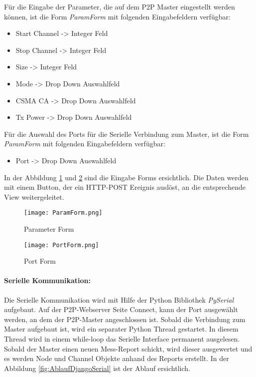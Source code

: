 Für die Eingabe der Parameter, die auf dem P2P Master eingestellt werden können, ist die Form \textit{ParamForm} mit folgenden Eingabefeldern verfügbar:
\begin{itemize}
	\item Start Channel \hspace{5mm} -> Integer Feld
	\item Stop Channel \hspace{6mm} -> Integer Feld
	\item Size \hspace{22.3mm} -> Integer Feld
	\item Mode \hspace{19.5mm} -> Drop Down Auswahlfeld
	\item CSMA CA \hspace{10.5mm} -> Drop Down Auswahlfeld
	\item Tx Power \hspace{13mm} -> Drop Down Auswahlfeld
\end{itemize}

Für die Auswahl des Ports für die Serielle Verbindung zum Master, ist die Form \textit{ParamForm} mit folgenden Eingabefeldern verfügbar:
\begin{itemize}
	\item  Port \hspace{22mm} -> Drop Down Auswahlfeld
\end{itemize}


In der Abbildung \ref{fig:ParamForm} und \ref{fig:PortForm} sind die Eingabe Forms ersichtlich. Die Daten werden mit einem Button, der ein HTTP-POST Ereignis auslöst, an die entsprechende View weitergeleitet.

\begin{figure} [H]
	\centering
	\texttt{[image: ParamForm.png]}
	\caption{Parameter Form}
	\label{fig:ParamForm}
\end{figure}

\begin{figure} [H]
	\centering
	\texttt{[image: PortForm.png]}
	\caption{Port Form}
	\label{fig:PortForm}
\end{figure}

\paragraph{Serielle Kommunikation:}\label{par:SerielleKommunikation}
Die Serielle Kommunikation wird mit Hilfe der Python Bibliothek \textit{PySerial} aufgebaut. Auf der P2P-Webserver Seite Connect, kann der Port ausgewählt werden, an dem der P2P-Master angeschlossen ist. Sobald die Verbindung zum Master aufgebaut ist, wird ein separater Python Thread gestartet. In diesem Thread wird in einem while-loop das Serielle Interface permanent ausgelesen. Sobald der Master einen neuen Mess-Report schickt, wird dieser ausgewertet und es werden Node und Channel Objekte anhand des Reports erstellt. In der Abbildung \ref{fig:AblaufDjangoSerial} ist der Ablauf ersichtlich.


